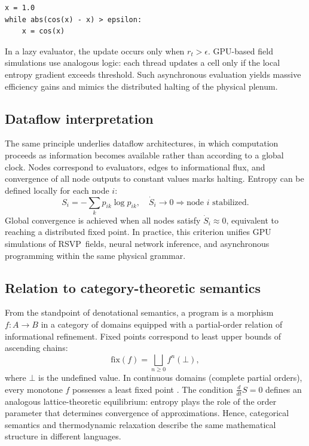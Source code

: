 \documentclass[12pt,a4paper]{article}
\newcommand{\RSVP}{RSVP}              %
\newcommand{\ddt}{\tfrac{d}{dt}}      %
\theoremstyle{plain}
\begin{document}
\begin{verbatim}
x = 1.0
while abs(cos(x) - x) > epsilon:
    x = cos(x)
\end{verbatim}

In a lazy evaluator, the update occurs only when \(r_t>\epsilon\).
GPU-based field simulations use analogous logic: each thread updates a cell only if the local entropy gradient exceeds threshold.
Such asynchronous evaluation yields massive efficiency gains and mimics the distributed halting of the physical plenum.

\subsection{Dataflow interpretation}
The same principle underlies dataflow architectures, in which computation proceeds as information becomes available rather than according to a global clock.
Nodes correspond to evaluators, edges to informational flux, and convergence of all node outputs to constant values marks halting.
Entropy can be defined locally for each node \(i\):
\[
S_i = -\sum_k p_{ik}\log p_{ik},
\quad
\dot{S}_i \to 0 \Rightarrow \text{node } i \text{ stabilized.}
\]
Global convergence is achieved when all nodes satisfy \(\dot{S}_i\approx0\),
equivalent to reaching a distributed fixed point.
In practice, this criterion unifies GPU simulations of \RSVP\ fields, neural network inference, and asynchronous programming within the same physical grammar.

\subsection{Relation to category-theoretic semantics}
From the standpoint of denotational semantics, a program is a morphism \(f: A \to B\) in a category of domains equipped with a partial-order relation of informational refinement.  
Fixed points correspond to least upper bounds of ascending chains:
\[
\text{fix}(f)=\bigsqcup_{n\ge0} f^n(\bot),
\]
where \(\bot\) is the undefined value.  
In continuous domains (complete partial orders), every monotone \(f\) possesses a least fixed point \citep{lawvere2009conceptual,maclane1998categories}.
The condition \(\ddt S=0\) defines an analogous lattice-theoretic equilibrium: 
entropy plays the role of the order parameter that determines convergence of approximations.
Hence, categorical semantics and thermodynamic relaxation describe the same mathematical structure in different languages.
\end{document}
